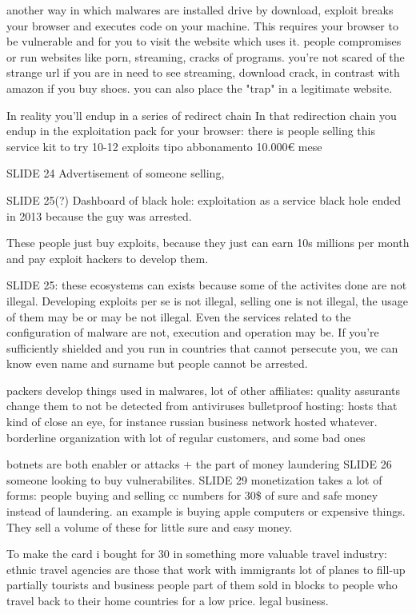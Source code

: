     another way in which malwares are installed
    drive by download, exploit breaks your browser and executes code on your machine. This requires your browser to be vulnerable and for you to visit the website which uses it.
    people compromises or run websites like porn, streaming, cracks of programs.
    you're not scared of the strange url if you are in need to see streaming, download crack, in contrast with amazon if you buy shoes.
    you can also place the "trap" in a legitimate website.

    In reality you'll endup in a series of redirect chain 
    In that redirection chain you endup in the exploitation pack for your browser:
        there is people selling this service kit to try 10-12 exploits tipo abbonamento 10.000€ mese 

SLIDE 24
    Advertisement of someone selling, 

SLIDE 25(?)
    Dashboard of black hole: exploitation as a service
    black hole ended in 2013 because the guy was arrested.

    These people just buy exploits, because they just can earn 10s millions per month and pay exploit hackers to develop them.

SLIDE 25:
    these ecosystems can exists because some of the activites done are not illegal. Developing exploits per se is not illegal, selling one is not illegal, the usage of them may be or may be not illegal.
    Even the services related to the configuration of malware are not, execution and operation may be.
    If you're sufficiently shielded and you run in countries that cannot persecute you, we can know even name and surname but people cannot be arrested.

    packers develop things used in malwares, 
    lot of other affiliates: quality assurants change them to not be detected from antiviruses
    bulletproof hosting: hosts that kind of close an eye, for instance russian business network hosted whatever.
    borderline organization with lot of regular customers, and some bad ones
    
    botnets are both enabler or attacks
    + the part of money laundering
SLIDE 26
    someone looking to buy vulnerabilites.
SLIDE 29
    monetization takes a lot of forms:
        people buying and selling cc numbers for 30\$ of sure and safe money instead of laundering.
        an example is buying apple computers or expensive things.
        They sell a volume of these for little sure and easy money.
        
        To make the card i bought for 30 in something more valuable
            travel industry: ethnic travel agencies are those that work with immigrants
            lot of planes to fill-up 
            partially tourists and business people
            part of them sold in blocks to people who travel back to their home countries for a low price.
            legal business.

